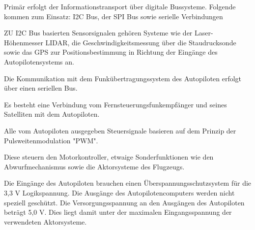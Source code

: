 Primär erfolgt der Informationstransport über digitale Bussysteme. Folgende kommen zum Einsatz: I2C Bus, der SPI Bus sowie serielle Verbindungen

ZU I2C  Bus basierten Sensorsignalen gehören Systeme wie der Laser-Höhenmesser LIDAR, die Geschwindigkeitsmessung über die Staudrucksonde sowie das GPS zur Positionsbestimmung in Richtung der Eingänge des Autopilotensystems an.

Die Kommunikation mit dem Funkübertragungssystem des Autopiloten erfolgt über einen seriellen Bus.

Es besteht eine Verbindung vom Fernsteuerungsfunkempfänger und seines Satelliten mit dem Autopiloten.

Alle vom Autopiloten ausgegeben Steuersignale basieren auf dem Prinzip der Pulsweitenmodulation "PWM".

Diese steuern den Motorkontroller, etwaige Sonderfunktionen wie den Abwurfmechanismus sowie die Aktorsysteme des Flugzeugs.


Die Eingänge des Autopiloten brauchen einen Überspannungsschutzsystem für die 3,3 V Logikspannung. Die Ausgänge des Autopilotencomputers werden nicht speziell geschützt. Die Versorgungsspannung an den Ausgängen des Autopiloten beträgt 5,0 V.  Dies liegt damit unter der  maximalen Eingangsspannung der verwendeten Aktorsysteme.


\begin{comment}
I2C  Bus basierten Sensorsignalen gehören Systeme wie der Laser-Höhenmesser LIDAR, die Geschwindigkeitsmessung über Staudrucksonde sowie das GPS zur Positionsbestimmung in Richtung der Eingänge des Autopilotensystems an.

Die Kommunikation mit dem Funkübertragungssystem des Autopiloten erfolgt über einen seriellen Bus.

Es besteht eine Verbindung vom Fernsteuerungsfunkempfänger und seines Satelliten mit dem Autopiloten.

Bisher basieren alle vom Autopiloten ausgegeben Steuersignale auf dem Prinzip der Pulsweitenmodulation "PWM"

Diese steuern den Motorkontroller, die Sonderfunktionen wie den Abwurfmechanismus sowie die Aktorsysteme des Flugzeugs .


Die Eingänge des Autopiloten bedürfen eines Überspannungsschutzsystems für 3,3 V Logikspannung.

Die Ausgänge des Autopilotencomputers werden nicht speziell geschützt. Hier wird die Versorgung der Ausgänge des Autopiloten mit 5,0V bewerkstelligt. Diese liegt damit unter der  maximalen Eingangsspannung der verwendeten Aktorsysteme.
\end{comment}


